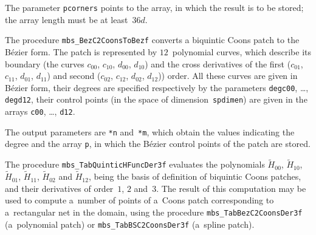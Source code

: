 The parameter \texttt{pcorners} points to the array, in which the result
is to be stored; the array length must be at least~$36d$.


\vspace{\bigskipamount}
The procedure \texttt{mbs\_BezC2CoonsToBezf} converts a biquintic
Coons patch to the B\'{e}zier form. The patch is represented by
$12$~polynomial curves, which describe its boundary (the curves $c_{00}$,
$c_{10}$, $d_{00}$, $d_{10}$) and the cross derivatives of the first
($c_{01}$, $c_{11}$, $d_{01}$, $d_{11}$) and second ($c_{02}$, $c_{12}$,
$d_{02}$, $d_{12}$)) order. All these curves are given in B\'{e}zier form,
their degrees are specified respectively by the parameters
\texttt{degc00}, \ldots, \texttt{degd12}, their control points (in the
space of dimension~\texttt{spdimen}) are given in the arrays
\texttt{c00}, \ldots, \texttt{d12}.

The output parameters are \texttt{*n} and~\texttt{*m}, which obtain the values
indicating the degree and the array \texttt{p}, in which the B\'{e}zier control
points of the patch are stored.

\vspace{\bigskipamount}
\begin{sloppypar}
The procedure \texttt{mbs\_TabQuinticHFuncDer3f} evaluates the polynomials
$\tilde{H}_{00}$, $\tilde{H}_{10}$, $\tilde{H}_{01}$, $\tilde{H}_{11}$,
$\tilde{H}_{02}$ and $\tilde{H}_{12}$, 
being the basis of definition of biquintic Coons patches, and their
derivatives of order~$1$, $2$ and~$3$. The result of this computation may be
used to compute a~number of points of a~Coons patch corresponding to
a~rectangular net in the domain, using the procedure
\texttt{mbs\_TabBezC2CoonsDer3f} (a~polynomial patch) or
\texttt{mbs\_TabBSC2CoonsDer3f} (a~spline patch).%
\end{sloppypar}

